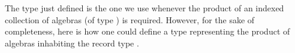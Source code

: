 \ccpad
The type just defined is the one we use whenever the product of an indexed collection of algebras (of type ) is required.  However, for the sake of completeness, here is how one could define a type representing the product of algebras inhabiting the record type .
\ccpad
\begin{code}%
\>[0][@{}l@{\AgdaIndent{0}}]%
\>[1]\AgdaSpace{}%
\<%
\\
\>[1]\AgdaSpace{}%
\AgdaSymbol{:}\AgdaSpace{}%
\AgdaSymbol{(}\AgdaSpace{}%
\AgdaSymbol{:}\AgdaSpace{}%
\AgdaSpace{}%
\AgdaSpace{}%
\AgdaSpace{}%
\AgdaSpace{}%
\AgdaSymbol{)}\AgdaSpace{}%
\AgdaSpace{}%
\AgdaSpace{}%
\AgdaSymbol{(}\AgdaSpace{}%
\AgdaSpace{}%
\AgdaSymbol{)}\AgdaSpace{}%
\<%
\\
%
\>[1]\AgdaSpace{}%
\AgdaSpace{}%
\AgdaSymbol{=}\AgdaSpace{}%
%
\>[100I]\AgdaSymbol{\{}\AgdaSpace{}%
\AgdaSpace{}%
\AgdaSymbol{=}\AgdaSpace{}%
\AgdaSpace{}%
\AgdaSpace{}%
\AgdaSpace{}%
\AgdaSpace{}%
\AgdaSymbol{(}\AgdaSpace{}%
\AgdaSymbol{)}\AgdaSpace{}\AgdaSymbol{;}%
\>[55]\<%
\\
\>[100I][@{}l@{\AgdaIndent{0}}]%
\>[15]\AgdaSpace{}%
\AgdaSymbol{=}\AgdaSpace{}%
\AgdaSpace{}%
\AgdaSpace{}%
\AgdaSpace{}%
\AgdaSpace{}%
\AgdaSpace{}%
\AgdaSymbol{(}\AgdaSpace{}%
\AgdaSymbol{(}\AgdaSpace{}%
\AgdaSymbol{))}\AgdaSpace{}%
\AgdaSpace{}%
\AgdaSpace{}%
\AgdaSpace{}%
\AgdaSpace{}%
\AgdaSpace{}%
\AgdaSpace{}%
\AgdaSpace{}\AgdaSymbol{\}}%
\>[55]\<%
\end{code}

